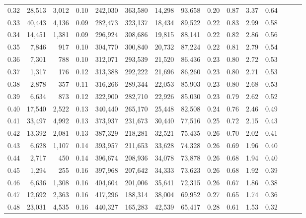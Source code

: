 \begin{tabular}{rrrrrrrrrrrrrrr}
0.32 &  28,513 &  3,012 &  0.10 &  242,030 &  363,580 &   14,298 &   93,658 &  0.20 &  0.87 &  3.37 &      0.64 \\
0.33 &  40,443 &  4,136 &  0.09 &  282,473 &  323,137 &   18,434 &   89,522 &  0.22 &  0.83 &  2.99 &      0.58 \\
0.34 &  14,451 &  1,381 &  0.09 &  296,924 &  308,686 &   19,815 &   88,141 &  0.22 &  0.82 &  2.86 &      0.56 \\
0.35 &   7,846 &    917 &  0.10 &  304,770 &  300,840 &   20,732 &   87,224 &  0.22 &  0.81 &  2.79 &      0.54 \\
0.36 &   7,301 &    788 &  0.10 &  312,071 &  293,539 &   21,520 &   86,436 &  0.23 &  0.80 &  2.72 &      0.53 \\
0.37 &   1,317 &    176 &  0.12 &  313,388 &  292,222 &   21,696 &   86,260 &  0.23 &  0.80 &  2.71 &      0.53 \\
0.38 &   2,878 &    357 &  0.11 &  316,266 &  289,344 &   22,053 &   85,903 &  0.23 &  0.80 &  2.68 &      0.53 \\
0.39 &   6,634 &    873 &  0.12 &  322,900 &  282,710 &   22,926 &   85,030 &  0.23 &  0.79 &  2.62 &      0.52 \\
0.40 &  17,540 &  2,522 &  0.13 &  340,440 &  265,170 &   25,448 &   82,508 &  0.24 &  0.76 &  2.46 &      0.49 \\
0.41 &  33,497 &  4,992 &  0.13 &  373,937 &  231,673 &   30,440 &   77,516 &  0.25 &  0.72 &  2.15 &      0.43 \\
0.42 &  13,392 &  2,081 &  0.13 &  387,329 &  218,281 &   32,521 &   75,435 &  0.26 &  0.70 &  2.02 &      0.41 \\
0.43 &   6,628 &  1,107 &  0.14 &  393,957 &  211,653 &   33,628 &   74,328 &  0.26 &  0.69 &  1.96 &      0.40 \\
0.44 &   2,717 &    450 &  0.14 &  396,674 &  208,936 &   34,078 &   73,878 &  0.26 &  0.68 &  1.94 &      0.40 \\
0.45 &   1,294 &    255 &  0.16 &  397,968 &  207,642 &   34,333 &   73,623 &  0.26 &  0.68 &  1.92 &      0.39 \\
0.46 &   6,636 &  1,308 &  0.16 &  404,604 &  201,006 &   35,641 &   72,315 &  0.26 &  0.67 &  1.86 &      0.38 \\
0.47 &  12,692 &  2,363 &  0.16 &  417,296 &  188,314 &   38,004 &   69,952 &  0.27 &  0.65 &  1.74 &      0.36 \\
0.48 &  23,031 &  4,535 &  0.16 &  440,327 &  165,283 &   42,539 &   65,417 &  0.28 &  0.61 &  1.53 &      0.32 \\

\end{tabular}
